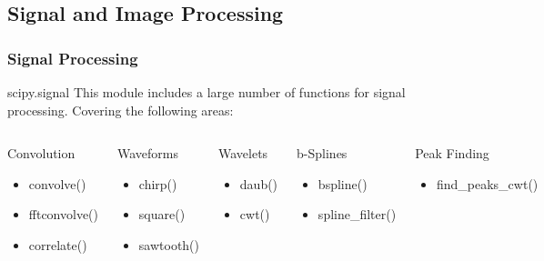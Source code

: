 \documentclass[10pt,colorlinks]{beamer}
\begin{document}
\subsection{Signal and Image Processing}
\begin{frame}[plain]\frametitle{Signal Processing}
\begin{block}{scipy.signal}
\small This module includes a large number of functions for signal processing. Covering the following areas: 
\end{block}

\small \begin{columns}[c]

    \begin{block}{Convolution}
         \begin{itemize}
             \item convolve()
                \item fftconvolve()
           \item correlate()
        \end{itemize}
    \end{block}
    \begin{block}{Waveforms}
         \begin{itemize}
        \item chirp()
         \item square()
            \item sawtooth()
       \end{itemize}
    \end{block}



\begin{block}{Wavelets}
  \begin{itemize}
   \item daub()
    \item cwt()
 \end{itemize}
\end{block}
    \begin{block}{b-Splines}
         \begin{itemize}
             \item bspline()
             \item spline\_filter()
        \end{itemize}
    \end{block}

\begin{block}{Peak Finding}
 \begin{itemize}
   \item find\_peaks\_cwt()
 \end{itemize}
\end{block}
\end{columns}
\end{frame}
\end{document}

